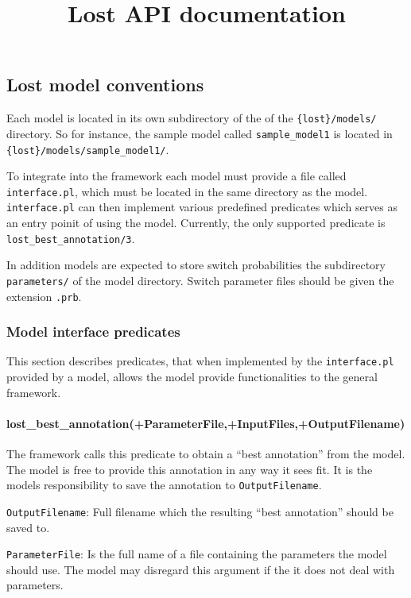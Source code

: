 \documentclass{article}
\title{Lost API documentation}
\begin{document}
\maketitle

\subsection{Lost model conventions}
\label{sec:lost_model_conventions}

Each model is located in its own subdirectory of the of the
\texttt{\{lost\}/models/} directory. So for instance, the sample model
called \texttt{sample\_model1} is located in
\texttt{\{lost\}/models/sample\_model1/}.

To integrate into the framework each model must provide a file called
\texttt{interface.pl}, which must be located in the same directory as
the model. \texttt{interface.pl} can then implement various predefined
predicates which serves as an entry poinit of using the
model. Currently, the only supported predicate is
\texttt{lost\_best\_annotation/3}.

In addition models are expected to store switch probabilities the
subdirectory \texttt{parameters/} of the model directory. Switch
parameter files should be given the extension \texttt{.prb}.



\subsubsection{Model interface predicates}

This section describes predicates, that when implemented by 
the \texttt{interface.pl} provided by a model, allows the 
model provide functionalities to the  general framework.

\noindent
\paragraph{lost\_best\_annotation(+ParameterFile,+InputFiles,+OutputFilename)}

The framework calls this predicate to obtain a ``best annotation''
from the model. The model is free to provide this annotation in
any way it sees fit. It is the models responsibility to save the
annotation to \texttt{OutputFilename}.

\texttt{OutputFilename}: Full filename which the resulting ``best
  annotation'' should be saved to.

\texttt{ParameterFile}: Is the full name of a file containing the
parameters the model should use. The model may disregard this argument
if the it does not deal with parameters. 
\end{document}
